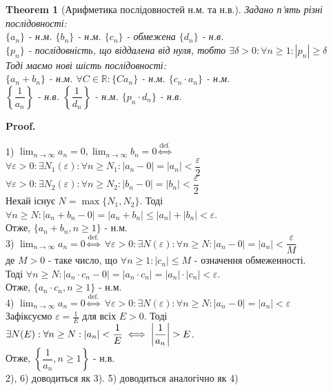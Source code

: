 \documentclass[a4paper, 14pt]{article}
\makeatletter
\def\qed{$\blacksquare$}
\theoremstyle{theoremdd}
\newtheorem{theorem}{Theorem}[subsection]
\theoremstyle{theoremdd}
\theoremstyle{theoremdd}
\theoremstyle{theoremdd}
\theoremstyle{theoremdd}
\theoremstyle{theoremdd}
\theoremstyle{theoremdd}
\theoremstyle{theoremdd}
\renewenvironment{proof}[1][Proof.\\]{\par
\pushQED{\hfill \qed}%
\normalfont \topsep6\p@\@plus6\p@\relax
\trivlist
\item\relax
{\bfseries
#1\@addpunct{.}}\hspace\labelsep\ignorespaces
}{%
\popQED\endtrivlist\@endpefalse
}
\makeatother
\begin{document}
	\begin{theorem}[Арифметика послідовностей н.м. та н.в.]
	Задано п'ять різні послідовності: \\
	$\{a_n\}$ - н.м. \hspace{0.5cm} $\{b_n\}$ - н.м. \hspace{0.5cm} $\{c_n\}$ - обмежена \hspace{0.5cm} $\{d_n\}$ - н.в. \\ $\{p_n\}$ - послідовність, що віддалена від нуля, тобто $\exists \delta>0: \forall n\geq 1: |p_n|\geq \delta$\\
	Тоді маємо нові шість послідовності: \\ $\{a_n+b_n\}$ - н.м. \hspace{0.5cm} $\forall C \in \mathbb{R}: \{C a_n\}$ - н.м. \hspace{0.5cm} $\{c_n \cdot a_n\}$ - н.м. \\ $\left\{ \dfrac{1}{a_n} \right\}$ - н.в. \hspace{0.5cm} $\left\{ \dfrac{1}{d_n} \right\}$ - н.м. \hspace{0.5cm} $\{p_n \cdot d_n \}$ - н.в.
	\end{theorem}
	
	\begin{proof}
	1) $\displaystyle \lim_{n \to \infty} a_n = 0, \lim_{n \to \infty} b_n = 0 \overset{\textrm{def.}}{\iff}$\\
	$\forall \varepsilon > 0: \exists N_1(\varepsilon): \forall n \geq N_1: |a_n-0| = |a_n| < \dfrac{\varepsilon}{2}$\\
	$\forall \varepsilon > 0: \exists N_2(\varepsilon): \forall n \geq N_2: |b_n-0| = |b_n| < \dfrac{\varepsilon}{2}$\\
	Нехай існує $N=\max\{N_1,N_2\}$. Тоді $\forall n \geq N: |a_n+b_n - 0| = |a_n+b_n| \leq |a_n|+|b_n| < \varepsilon$.\\
	Отже, $\{a_n+b_n, n \geq 1\}$ - н.м.
	\bigskip \\
	3) $\displaystyle \lim_{n \to \infty} a_n = 0 \overset{\textrm{def.}}{\iff}$ $\forall \varepsilon > 0: \exists N(\varepsilon): \forall n \geq N: |a_n-0| = |a_n| < \dfrac{\varepsilon}{M}$\\
	де $M>0$ - таке число, що $\forall n \geq 1: |c_n| \leq M$ - означення обмеженності.\\
	Тоді $\forall n \geq N: |a_n \cdot c_n - 0| = |a_n \cdot c_n| = |a_n| \cdot |c_n| < \varepsilon$.\\
	Отже, $\{a_n \cdot c_n, n \geq 1 \}$ - н.м.
	\bigskip \\
	4) $\displaystyle \lim_{n \to \infty} a_n = 0 \overset{\textrm{def.}}{\iff}$ $\forall \varepsilon > 0: \exists N(\varepsilon): \forall n \geq N: |a_n-0| = |a_n| < \varepsilon$\\
	Зафіксуємо $\displaystyle \varepsilon = \frac{1}{E}$ для всіх $E>0$. Тоді $\displaystyle \exists N(E): \forall n \geq N: |a_n|<\frac{1}{E} \iff \abs{\frac{1}{a_n}} > E$.\\
	Отже, $\left\{ \dfrac{1}{a_n}, n \geq 1 \right\}$ - н.в.
	\bigskip \\
	2), 6) доводиться як 3). 5) доводиться аналогічно як 4)
	\end{proof}
	
\end{document}
